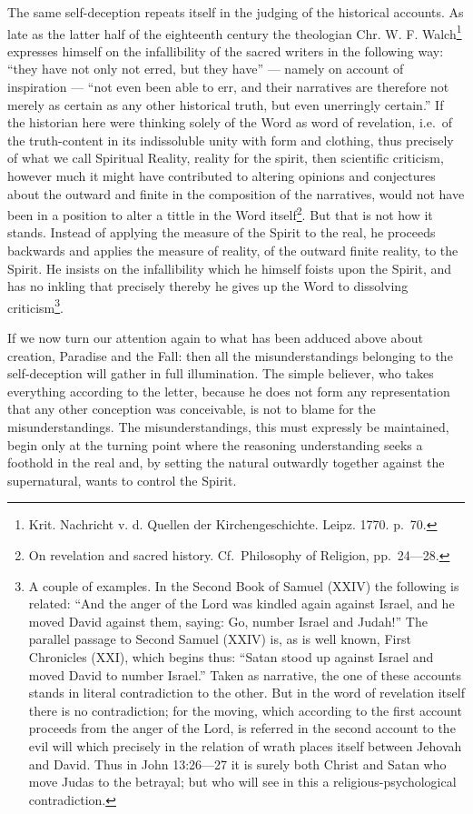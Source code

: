 \documentclass[12pt,a4paper,openany]{book}
\newcommand{\opage}[1]{\marginnote{\footnotesize\textit{[#1]}}}
\begin{document}
The same self-deception repeats itself in the judging
of the historical accounts. As late as the latter
half of the eighteenth century the theologian
Chr. W. F. Walch\footnote[1]{Krit. Nachricht v. d. Quellen der Kirchengeschichte. Leipz. 1770. p.\ 70.} expresses himself on the infallibility
of the sacred writers in the following way: ``they have not only
not erred, but they have'' --- namely on account of inspiration
--- ``not even been able to err, and their narratives
are therefore not merely as certain as any
other historical truth, but even unerringly
certain.'' If the historian here were thinking solely
of the Word as word of revelation, i.e.\ of the truth-content
in its indissoluble unity with form and
clothing, thus precisely of what we call Spiritual Reality,
reality for the spirit, then scientific
criticism, however much it might have contributed
to altering opinions and conjectures about the outward
and finite in the composition of the narratives,
would not have been in a position to alter a tittle in the Word
itself\footnote[2]{On revelation and sacred history. Cf.\ Philosophy of Religion, pp.\ 24---28.}. But that is not how it stands. Instead of
\setcounter{footnote}{0}%
\opage{316}applying the measure of the Spirit to the real, he proceeds
backwards and applies the measure of reality, of the
outward finite reality, to the Spirit.
He insists on the infallibility which he himself foists upon
the Spirit, and has no inkling that precisely thereby he gives up the Word
to dissolving criticism\footnote[1]{A couple of examples. In the Second Book of Samuel (XXIV) the following is related: ``And the anger of the Lord was kindled again against Israel, and he moved David against them, saying: Go, number Israel and Judah!'' The parallel passage to Second Samuel (XXIV) is, as is well known, First Chronicles (XXI), which begins thus: ``Satan stood up against Israel and moved David to number Israel.'' Taken as narrative, the one of these accounts stands in literal contradiction to the other. But in the word of revelation itself there is no contradiction; for the moving, which according to the first account proceeds from the anger of the Lord, is referred in the second account to the evil will which precisely in the relation of wrath places itself between Jehovah and David. Thus in John 13:26---27 it is surely both Christ and Satan who move Judas to the betrayal; but who will see in this a religious-psychological contradiction.}.

If we now turn our attention again to what
has been adduced above about creation, Paradise
and the Fall: then all the misunderstandings belonging to the self-deception
will gather in full illumination. The simple
believer, who takes everything according to the letter, because he does not
form any representation that any other conception
was conceivable, is not to blame for the misunderstandings.
The misunderstandings, this must expressly be maintained, begin
only at the turning point where the reasoning
understanding seeks a foothold in the real and, by
setting the natural outwardly together against the supernatural, wants to
control the Spirit.
\end{document}
